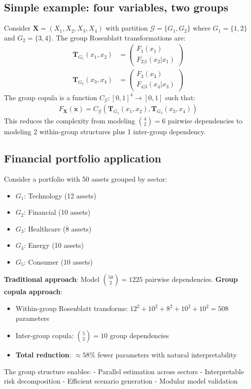 \subsection{Simple example: four variables, two groups}
\begin{example}
Consider $\mathbf{X} = (X_1, X_2, X_3, X_4)$ with partition $\mathcal{G} = \{G_1, G_2\}$ where $G_1 = \{1, 2\}$ and $G_2 = \{3, 4\}$.
The group Rosenblatt transformations are:
\begin{align}
\mathbf{T}_{G_1}(x_1, x_2) &= \begin{pmatrix} F_1(x_1) \\ F_{2|1}(x_2|x_1) \end{pmatrix} \\
\mathbf{T}_{G_2}(x_3, x_4) &= \begin{pmatrix} F_3(x_3) \\ F_{4|3}(x_4|x_3) \end{pmatrix}
\end{align}
The group copula is a function $C_{\mathcal{G}}: [0,1]^4 \to [0,1]$ such that:
\begin{align}
F_{\mathbf{X}}(\mathbf{x}) = C_{\mathcal{G}}(\mathbf{T}_{G_1}(x_1, x_2), \mathbf{T}_{G_2}(x_3, x_4))
\end{align}
This reduces the complexity from modeling $\binom{4}{2} = 6$ pairwise dependencies to modeling 2 within-group structures plus 1 inter-group dependency.
\end{example}

\subsection{Financial portfolio application}
\begin{example}
Consider a portfolio with 50 assets grouped by sector:
\begin{itemize}
    \item $G_1$: Technology (12 assets)
    \item $G_2$: Financial (10 assets)
    \item $G_3$: Healthcare (8 assets)
    \item $G_4$: Energy (10 assets)
    \item $G_5$: Consumer (10 assets)
\end{itemize}
\textbf{Traditional approach}: Model $\binom{50}{2} = 1225$ pairwise dependencies.
\textbf{Group copula approach}:
\begin{itemize}
    \item Within-group Rosenblatt transforms: $12^2 + 10^2 + 8^2 + 10^2 + 10^2 = 508$ parameters
    \item Inter-group copula: $\binom{5}{2} = 10$ group dependencies
    \item \textbf{Total reduction}: $\approx 58\%$ fewer parameters with natural interpretability
\end{itemize}
The group structure enables:
- Parallel estimation across sectors
- Interpretable risk decomposition
- Efficient scenario generation
- Modular model validation
\end{example}

